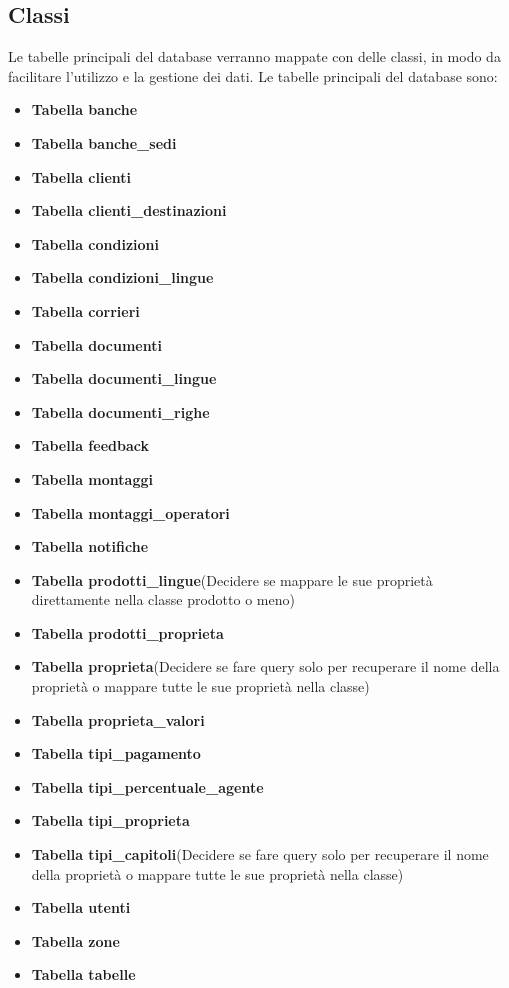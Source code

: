 \documentclass[12pt, a4paper]{article}
\begin{document}
\subsection{Classi}
Le tabelle principali del database verranno mappate con delle classi, in modo da facilitare l'utilizzo e la gestione dei dati.
Le tabelle principali del database sono:
\begin{itemize}
    \item \textbf{Tabella banche}
    \item \textbf{Tabella banche\_sedi}
    \item \textbf{Tabella clienti}
    \item \textbf{Tabella clienti\_destinazioni}
    \item \textbf{Tabella condizioni}
    \item \textbf{Tabella condizioni\_lingue}
    \item \textbf{Tabella corrieri}
    \item \textbf{Tabella documenti}
    \item \textbf{Tabella documenti\_lingue}
    \item \textbf{Tabella documenti\_righe}
    \item \textbf{Tabella feedback}
    \item \textbf{Tabella montaggi}
    \item \textbf{Tabella montaggi\_operatori}
    \item \textbf{Tabella notifiche}
    \item \textbf{Tabella prodotti\_lingue}(Decidere se mappare le sue proprietà direttamente nella classe prodotto o meno)
    \item \textbf{Tabella prodotti\_proprieta}
    \item \textbf{Tabella proprieta}(Decidere se fare query solo per recuperare il nome della proprietà o mappare tutte le sue proprietà nella classe)
    \item \textbf{Tabella proprieta\_valori}
    \item \textbf{Tabella tipi\_pagamento}
    \item \textbf{Tabella tipi\_percentuale\_agente}
    \item \textbf{Tabella tipi\_proprieta}
    \item \textbf{Tabella tipi\_capitoli}(Decidere se fare query solo per recuperare il nome della proprietà o mappare tutte le sue proprietà nella classe)
    \item \textbf{Tabella utenti}
    \item \textbf{Tabella zone}
    \item \textbf{Tabella tabelle}
\end{itemize}
\end{document}
